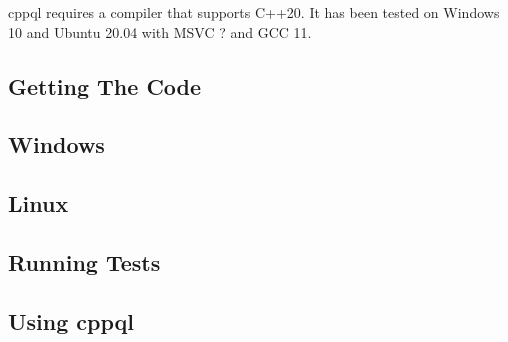 cppql requires a compiler that supports C++20. It has been tested on Windows 10 and Ubuntu 20.04 with MSVC ? and GCC 11.

\subsection{Getting The Code}
\label{section:build:get}



\subsection{Windows}
\label{section:build:windows}


\subsection{Linux}
\label{section:build:linux}


\subsection{Running Tests}
\label{section:build:tests}

\subsection{Using cppql}
\label{section:build:use}
